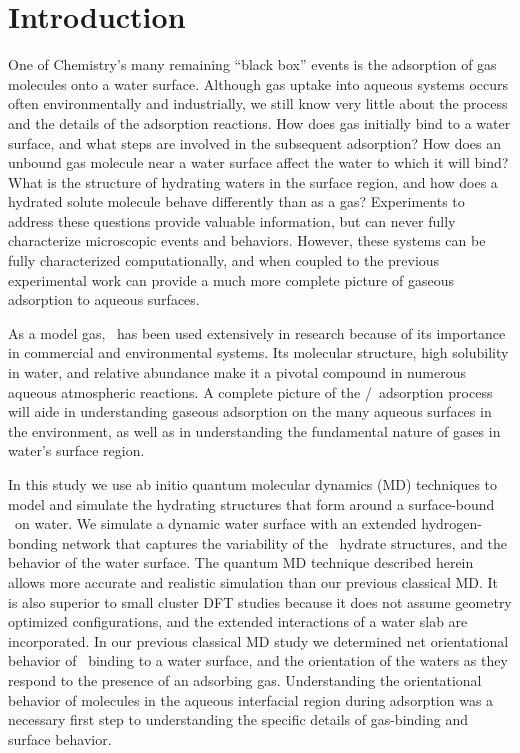 \section {Introduction}

One of Chemistry's many remaining ``black box'' events is the adsorption of gas molecules onto a water surface. Although gas uptake into aqueous systems occurs often environmentally and industrially, we still know very little about the process and the details of the adsorption reactions. How does gas initially bind to a water surface, and what steps are involved in the subsequent adsorption? How does an unbound gas molecule near a water surface affect the water to which it will bind? What is the structure of hydrating waters in the surface region, and how does a hydrated solute molecule behave differently than as a gas? Experiments to address these questions provide valuable information, but can never fully characterize microscopic events and behaviors. However, these systems can be fully characterized computationally, and when coupled to the previous experimental work can provide a much more complete picture of gaseous adsorption to aqueous surfaces.

As a model gas, \suldiox~has been used extensively in research because of its importance in commercial and environmental systems. \cite{Boniface2000,Jayne1990,Johns2011,Heber1997,Faloona2009,Clegg2001} Its molecular structure, high solubility in water, and relative abundance make it a pivotal compound in numerous aqueous atmospheric reactions. A complete picture of the \suldiox/\wat~adsorption process will aide in understanding gaseous adsorption on the many aqueous surfaces in the environment, as well as in understanding the fundamental nature of gases in water's surface region. 

In this study we use ab initio quantum molecular dynamics (MD) techniques to model and simulate the hydrating structures that form around a surface-bound \suldiox~on water. We simulate a dynamic water surface with an extended hydrogen-bonding network that captures the variability of the \suldiox~hydrate structures, and the behavior of the water surface. The quantum MD technique described herein allows more accurate and realistic simulation than our previous classical MD.\cite{Shamay2011} It is also superior to small cluster DFT studies because it does not assume geometry optimized configurations, and the extended interactions of a water slab are incorporated. In our previous classical MD study we determined net orientational behavior of \suldiox~binding to a water surface, and the orientation of the waters as they respond to the presence of an adsorbing gas. Understanding the orientational behavior of molecules in the aqueous interfacial region during adsorption was a necessary first step to understanding the specific details of gas-binding and surface behavior. 

